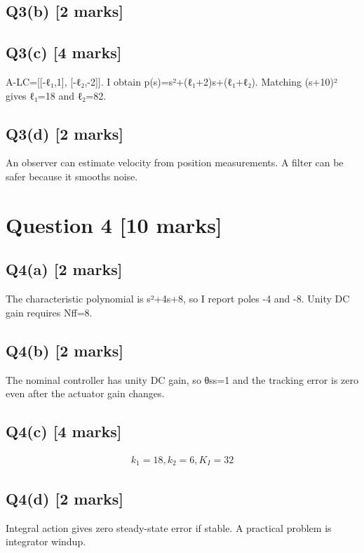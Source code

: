 \documentclass[11pt,a4paper]{article}
\begin{document}
\vspace{2mm}

\subsection*{Q3(b) \hfill [2 marks]}

\vspace{2mm}

\subsection*{Q3(c) \hfill [4 marks]}

A-LC=[[-ℓ₁,1], [-ℓ₂,-2]].
I obtain p(s)=s²+(ℓ₁+2)s+(ℓ₁+ℓ₂).
Matching (s+10)² gives ℓ₁=18 and ℓ₂=82.

\subsection*{Q3(d) \hfill [2 marks]}

An observer can estimate velocity from position measurements.
A filter can be safer because it smooths noise.

\section*{Question 4 \hfill [10 marks]}
\subsection*{Q4(a) \hfill [2 marks]}

The characteristic polynomial is s²+4s+8, so I report poles -4 and -8.
Unity DC gain requires Nff=8.

\subsection*{Q4(b) \hfill [2 marks]}

The nominal controller has unity DC gain, so θss=1 and the tracking error is zero even after the actuator gain changes.

\subsection*{Q4(c) \hfill [4 marks]}

\[\begin{aligned}k_1=18, k_2=6, K_I=32\end{aligned}\]

\subsection*{Q4(d) \hfill [2 marks]}

Integral action gives zero steady-state error if stable.
A practical problem is integrator windup.
\end{document}
